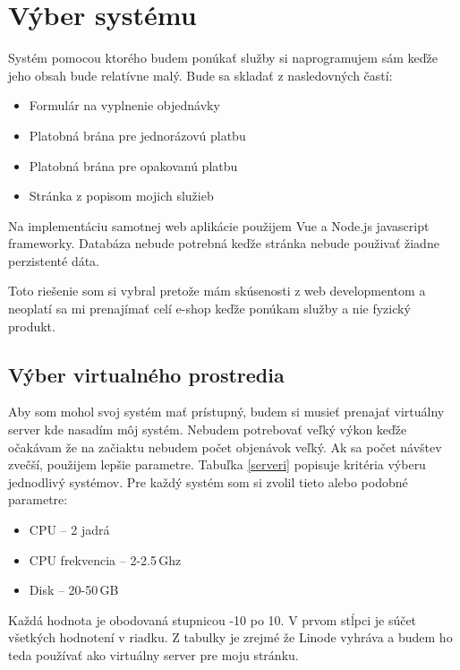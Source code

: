 \chapter{Výber systému}

Systém pomocou ktorého budem ponúkať služby si naprogramujem sám keďže jeho obsah bude relatívne malý. Bude sa skladať z nasledovných častí:

\begin{itemize}
  \item Formulár na vyplnenie objednávky
  \item Platobná brána pre jednorázovú platbu
  \item Platobná brána pre opakovanú platbu
  \item Stránka z popisom mojich služieb
\end{itemize}

Na implementáciu samotnej web aplikácie použijem Vue \cite{vue} a Node.js \cite{Node} javascript frameworky. Databáza nebude potrebná keďže stránka nebude použivať žiadne perzistenté dáta.

Toto riešenie som si vybral pretože mám skúsenosti z web developmentom a neoplatí sa mi prenajímať celí e-shop keďže ponúkam služby a nie fyzický produkt.

\section{Výber virtualného prostredia}

Aby som mohol svoj systém mať prístupný, budem si musieť prenajať virtuálny server kde nasadím môj systém. Nebudem potrebovať veľký výkon keďže očakávam že na začiaktu nebudem počet objenávok veľký. Ak sa počet návštev zvečší, použijem lepšie parametre. Tabuľka \ref{serveri} popisuje kritéria výberu jednodlivý systémov. Pre každý systém som si zvolil tieto alebo podobné parametre:

\begin{itemize}
  \item CPU -- 2 jadrá
  \item CPU frekvencia -- 2-2.5\,Ghz
  \item Disk -- 20-50\,GB
\end{itemize}
Každá hodnota je obodovaná stupnicou -10 po 10. V prvom stĺpci je súčet všetkých hodnotení v riadku. Z tabulky je zrejmé že Linode vyhráva a budem ho teda používať ako virtuálny server pre moju stránku.


